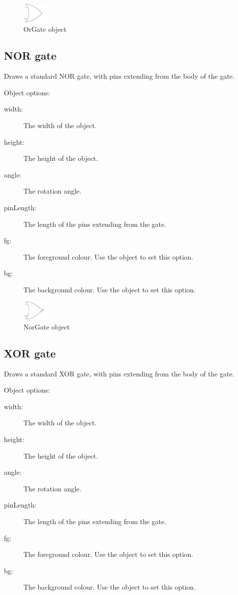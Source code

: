\begin{figure}[h]
\centerline{\includegraphics[height=1cm]{electronics/OrGate}}
\caption{OrGate object}
\label{fig:or_gate}
\end{figure}

\subsection{NOR gate}
Draws a standard NOR gate, with pins extending from the body of the gate.

Object options:
\begin{description}
\item[width:] The width of the object.
\item[height:] The height of the object.
\item[angle:] The rotation angle.
\item[pinLength:] The length of the pins extending from the gate.
\item[fg:] The foreground colour.  Use the  object to set this
option.
\item[bg:] The background colour.  Use the  object to set this
option.
\end{description}

\begin{figure}[h]
\centerline{\includegraphics[height=1cm]{electronics/NorGate}}
\caption{NorGate object}
\label{fig:nor_gate}
\end{figure}

\subsection{XOR gate}
Draws a standard XOR gate, with pins extending from the body of the gate.

Object options:
\begin{description}
\item[width:] The width of the object.
\item[height:] The height of the object.
\item[angle:] The rotation angle.
\item[pinLength:] The length of the pins extending from the gate.
\item[fg:] The foreground colour.  Use the  object to set this
option.
\item[bg:] The background colour.  Use the  object to set this
option.
\end{description}

